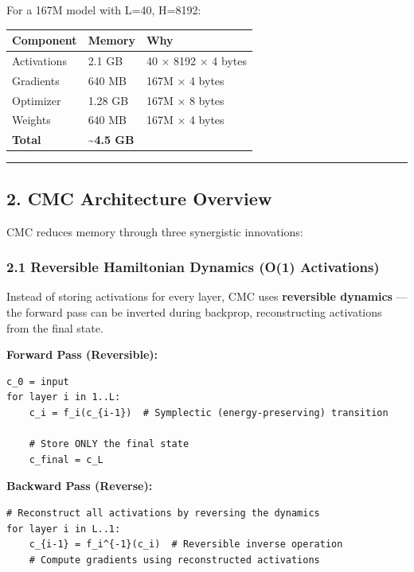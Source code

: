 \documentclass[
  11pt,
  a4paper,
]{article}
\begin{document}
For a 167M model with L=40, H=8192:

\begin{longtable}[]{@{}lll@{}}
\toprule\noalign{}
Component & Memory & Why \\
\midrule\noalign{}
\endhead
\bottomrule\noalign{}
\endlastfoot
Activations & 2.1 GB & 40 × 8192 × 4 bytes \\
Gradients & 640 MB & 167M × 4 bytes \\
Optimizer & 1.28 GB & 167M × 8 bytes \\
Weights & 640 MB & 167M × 4 bytes \\
\textbf{Total} & \textbf{\textasciitilde4.5 GB} & \\
\end{longtable}

\begin{center}\rule{0.5\linewidth}{0.5pt}\end{center}

\subsection{2. CMC Architecture
Overview}\label{cmc-architecture-overview}

CMC reduces memory through three synergistic innovations:

\subsubsection{2.1 Reversible Hamiltonian Dynamics (O(1)
Activations)}\label{reversible-hamiltonian-dynamics-o1-activations}

Instead of storing activations for every layer, CMC uses
\textbf{reversible dynamics} --- the forward pass can be inverted during
backprop, reconstructing activations from the final state.

\textbf{Forward Pass (Reversible):}

\begin{verbatim}
c_0 = input
for layer i in 1..L:
    c_i = f_i(c_{i-1})  # Symplectic (energy-preserving) transition
    
    # Store ONLY the final state
    c_final = c_L
\end{verbatim}

\textbf{Backward Pass (Reverse):}

\begin{verbatim}
# Reconstruct all activations by reversing the dynamics
for layer i in L..1:
    c_{i-1} = f_i^{-1}(c_i)  # Reversible inverse operation
    # Compute gradients using reconstructed activations
\end{verbatim}
\end{document}
